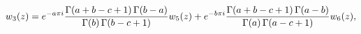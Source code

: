 \[w_{3}(z)=e^{-a\pi i}\frac{\mathop{\Gamma\/}\nolimits\!\left(a+b-c+1\right)%
\mathop{\Gamma\/}\nolimits\!\left(b-a\right)}{\mathop{\Gamma\/}\nolimits\!%
\left(b\right)\mathop{\Gamma\/}\nolimits\!\left(b-c+1\right)}w_{5}(z)+e^{-b\pi
i%
}\frac{\mathop{\Gamma\/}\nolimits\!\left(a+b-c+1\right)\mathop{\Gamma\/}%
\nolimits\!\left(a-b\right)}{\mathop{\Gamma\/}\nolimits\!\left(a\right)\mathop%
{\Gamma\/}\nolimits\!\left(a-c+1\right)}w_{6}(z),\]